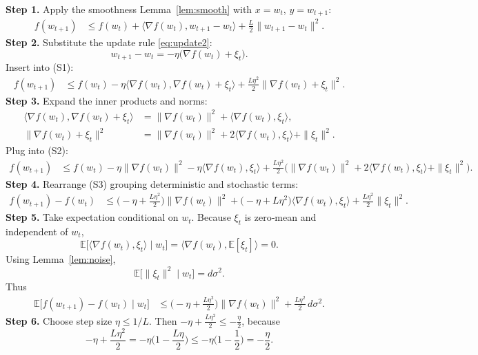 \documentclass{article}
\newcommand{\E}{\mathbb{E}}
\begin{document}
\bigskip
\noindent\textbf{Step 1.}  Apply the smoothness Lemma~\ref{lem:smooth} with $x=w_t$, $y=w_{t+1}$:
\begin{align}
f(w_{t+1})
&\le f(w_t)+\langle\nabla f(w_t),w_{t+1}-w_t\rangle
      +\frac{L}{2}\|w_{t+1}-w_t\|^2 . \tag{S1}
\end{align}
\noindent\textbf{Step 2.}  Substitute the update rule \eqref{eq:update2}:
\[
w_{t+1}-w_t=-\eta\big(\nabla f(w_t)+\xi_t\big).
\]
Insert into (S1):
\begin{align}
f(w_{t+1})
&\le f(w_t)-\eta\langle\nabla f(w_t),\nabla f(w_t)+\xi_t\rangle
      +\frac{L\eta^2}{2}\|\nabla f(w_t)+\xi_t\|^2 . \tag{S2}
\end{align}
\noindent\textbf{Step 3.}  Expand the inner products and norms:
\begin{align}
\langle\nabla f(w_t),\nabla f(w_t)+\xi_t\rangle
   &=\|\nabla f(w_t)\|^2+\langle\nabla f(w_t),\xi_t\rangle ,\\
\|\nabla f(w_t)+\xi_t\|^2
   &=\|\nabla f(w_t)\|^2+2\langle\nabla f(w_t),\xi_t\rangle+\|\xi_t\|^2 .
\end{align}
Plug into (S2):
\begin{align}
f(w_{t+1})
&\le f(w_t)-\eta\|\nabla f(w_t)\|^2-\eta\langle\nabla f(w_t),\xi_t\rangle
   +\frac{L\eta^2}{2}\Big(\|\nabla f(w_t)\|^2+2\langle\nabla f(w_t),\xi_t\rangle+\|\xi_t\|^2\Big). \tag{S3}
\end{align}
\noindent\textbf{Step 4.}  Rearrange (S3) grouping deterministic and stochastic terms:
\begin{align}
f(w_{t+1})-f(w_t)
&\le \Big(-\eta+\frac{L\eta^2}{2}\Big)\|\nabla f(w_t)\|^2
   +\Big(-\eta+\!L\eta^2\Big)\langle\nabla f(w_t),\xi_t\rangle
   +\frac{L\eta^2}{2}\|\xi_t\|^2 . \tag{S4}
\end{align}
\noindent\textbf{Step 5.}  Take expectation conditional on $w_t$.
Because $\xi_t$ is zero‑mean and independent of $w_t$,
\[
\E\big[\langle\nabla f(w_t),\xi_t\rangle\mid w_t\big]=\langle\nabla f(w_t),\E[\xi_t]\rangle=0 .
\]
Using Lemma~\ref{lem:noise},
\[
\E\big[\|\xi_t\|^2\mid w_t\big]=d\sigma^2 .
\]
Thus
\begin{align}
\E\big[f(w_{t+1})-f(w_t)\mid w_t\big]
&\le \Big(-\eta+\frac{L\eta^2}{2}\Big)\|\nabla f(w_t)\|^2
   +\frac{L\eta^2}{2}\,d\sigma^2 . \tag{S5}
\end{align}
\noindent\textbf{Step 6.}  Choose step size $\eta\le 1/L$.
Then $-\eta+\frac{L\eta^2}{2}\le -\frac{\eta}{2}$, because
\[
-\eta+\frac{L\eta^2}{2}= -\eta\Big(1-\frac{L\eta}{2}\Big)
\le -\eta\Big(1-\frac12\Big) = -\frac{\eta}{2}.
\]
\end{document}
